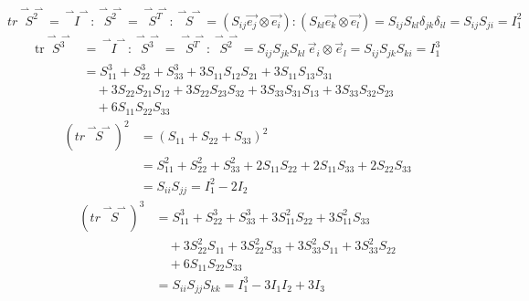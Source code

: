 \documentclass[12pt, a4paper, oneside, UTF8]{ctexbook}  %
\newcommand{\vvec}{\overset{\rightharpoonup\!\!\!\! \rightharpoonup}}
\begin{document}
\begin{corollary}
    \[tr\vvec{S^2}=\vvec{I}:\vvec{S^2}=\vvec{S^T}:\vvec{S}
    =\left(S_{ij}\vec{e_j}\otimes\vec{e_i}\right):\left(S_{kl}\vec{e_k}\otimes\vec{e_l}\right)
    =S_{ij}S_{kl}\delta_{jk}\delta_{il}=S_{ij}S_{ji}=I_1^2\]
    \begin{align*}
        \text{tr} \vvec{S^3}&= \vvec{I} : \vvec{S^3} = \vvec{S^T} : \vvec{S^2} 
        =S_{ij} S_{jk} S_{kl} \, \vec{e}_i \otimes \vec{e}_l
        =S_{ij} S_{jk} S_{ki}=I_1^3\\
        &=S_{11}^3 + S_{22}^3 + S_{33}^3 
        + 3 S_{11} S_{12} S_{21} + 3 S_{11} S_{13} S_{31} \\
        &\quad + 3 S_{22} S_{21} S_{12} + 3 S_{22} S_{23} S_{32} 
        + 3 S_{33} S_{31} S_{13} + 3 S_{33} S_{32} S_{23} \\
        &\quad + 6 S_{11} S_{22} S_{33}
        \end{align*}    
    \begin{align*}
        \left(tr\vvec{S}\right)^2&=\left(S_{11} + S_{22} + S_{33}\right)^2 \\
        &= S_{11}^2 + S_{22}^2 + S_{33}^2 
         + 2 S_{11} S_{22} + 2 S_{11} S_{33} + 2 S_{22} S_{33}\\
        &=S_{ii}S_{jj}=I_1^2 - 2 I_2
    \end{align*}
    \begin{align*}
        \left(tr\vvec{S}\right)^3         
        &=S_{11}^3 + S_{22}^3 + S_{33}^3 
        + 3 S_{11}^2 S_{22} + 3 S_{11}^2 S_{33} \\
        &\quad + 3 S_{22}^2 S_{11} + 3 S_{22}^2 S_{33} 
        + 3 S_{33}^2 S_{11} + 3 S_{33}^2 S_{22} \\
        &\quad + 6 S_{11} S_{22} S_{33}\\
        &=S_{ii} S_{jj} S_{kk}=I_1^3 - 3 I_1 I_2 + 3 I_3
    \end{align*}
\end{corollary}
\end{document}
